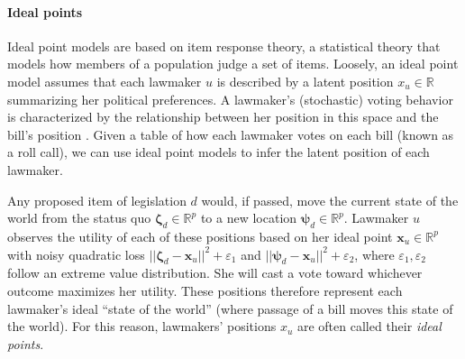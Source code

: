 \paragraph{Ideal points}


Ideal point models are based on item response theory, a statistical
theory that models how members of a population judge a set of items.
Loosely, an ideal point model assumes that each lawmaker $u$ is
described by a latent position $x_u \in \mathbb{R}$ summarizing her
political preferences.  A lawmaker's (stochastic) voting behavior is
characterized by the relationship between her position in this space
and the bill's position
\cite{poole:1985,poole:1991,jackman:2001,martin:2002,clinton:2004}.
Given a table of how each lawmaker votes on each bill (known as a roll
call), we can use ideal point models to infer the latent position of
each lawmaker.

Any proposed item of legislation $d$ would, if passed, move the
current state of the world from the status quo $\bm \zeta_d \in
\mathbb{R}^p$ to a new location $\bm \psi_d \in \mathbb{R}^p$.
Lawmaker $u$ observes the utility of each of these positions based on
her ideal point $\bm x_u \in \mathbb{R}^p$ with noisy quadratic loss
$|| \bm \zeta_d - \bm x_u ||^2 + \varepsilon_1$ and $|| \bm \psi_d -
\bm x_u ||^2 + \varepsilon_2$, where $\varepsilon_1, \varepsilon_2$
follow an extreme value distribution.  She will cast a vote toward
whichever outcome maximizes her utility.  These positions
therefore represent each lawmaker's ideal ``state of the world''
(where passage of a bill moves this state of the world).  For this
reason, lawmakers' positions $x_u$ are often called their \emph{ideal
  points}.

